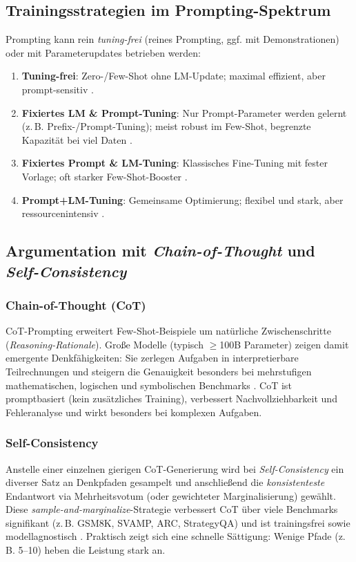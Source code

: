 \subsection{Trainingsstrategien im Prompting-Spektrum}
Prompting kann rein \emph{tuning-frei} (reines Prompting, ggf. mit Demonstrationen) oder mit Parameterupdates betrieben werden:
\begin{enumerate}
  \item \textbf{Tuning-frei}: Zero-/Few-Shot ohne LM-Update; maximal effizient, aber prompt-sensitiv \cite{liu2023survey}.
  \item \textbf{Fixiertes LM \& Prompt-Tuning}: Nur Prompt-Parameter werden gelernt (z.\,B. Prefix-/Prompt-Tuning); meist robust im Few-Shot, begrenzte Kapazität bei viel Daten \cite{liu2023survey}.
  \item \textbf{Fixiertes Prompt \& LM-Tuning}: Klassisches Fine-Tuning mit fester Vorlage; oft starker Few-Shot-Booster \cite{liu2023survey}.
  \item \textbf{Prompt+LM-Tuning}: Gemeinsame Optimierung; flexibel und stark, aber ressourcenintensiv \cite{liu2023survey}.
\end{enumerate}

\subsection{Argumentation mit \emph{Chain-of-Thought} und \emph{Self-Consistency}}
\subsubsection{Chain-of-Thought (CoT)}
CoT-Prompting erweitert Few-Shot-Beispiele um natürliche Zwischenschritte (\emph{Reasoning-Rationale}). Große Modelle (typisch \(\ge\)100B Parameter) zeigen damit emergente Denkfähigkeiten: Sie zerlegen Aufgaben in interpretierbare Teilrechnungen und steigern die Genauigkeit besonders bei mehrstufigen mathematischen, logischen und symbolischen Benchmarks \cite{wei2022cot}. CoT ist promptbasiert (kein zusätzliches Training), verbessert Nachvollziehbarkeit und Fehleranalyse und wirkt besonders bei komplexen Aufgaben.

\subsubsection{Self-Consistency}
Anstelle einer einzelnen gierigen CoT-Generierung wird bei \emph{Self-Consistency} ein diverser Satz an Denkpfaden gesampelt und anschließend die \emph{konsistenteste} Endantwort via Mehrheitsvotum (oder gewichteter Marginalisierung) gewählt. Diese \emph{sample-and-marginalize}-Strategie verbessert CoT über viele Benchmarks signifikant (z.\,B. GSM8K, SVAMP, ARC, StrategyQA) und ist trainingsfrei sowie modellagnostisch \cite{wang2022selfconsistency}. Praktisch zeigt sich eine schnelle Sättigung: Wenige Pfade (z.\,B. 5–10) heben die Leistung stark an.

